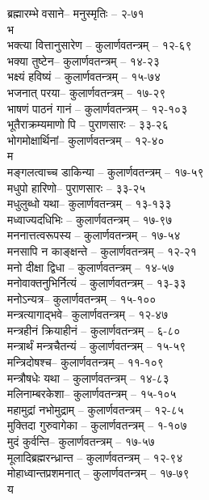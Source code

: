 \begin{raggedright}
\begin{parcolumns}[colwidths={1=.55\textwidth,2=.55\textwidth}]{2}
{ब्रह्मारम्भेवसाने– 	मनुस्मृतिः  – २-७१\\
{\large भ}\\
भक्त्या वित्तानुसारेण	– 	कुलार्णवतन्त्रम्  – १२-६९\\
भक्या तुष्टेन– 	कुलार्णवतन्त्रम्  – १४-२३\\
भक्ष्यं हविष्यं	– 	कुलार्णवतन्त्रम्  – १५-७४\\
भजनात् परया– 	 कुलार्णवतन्त्रम्  – १७-२९\\
भाषणं पाठनं गानं	– 	कुलार्णवतन्त्रम्  – १२-१०३\\
भूतैराक्रम्यमाणोपि	– 	पुराणसारः   – ३३-२६	\\
भोगमोक्षार्थिनां– कुलार्णवतन्त्रम्  – १२-४०\\
{\large म}\\
मङ्गलत्वाच्च डाकिन्या	– 	कुलार्णवतन्त्रम्  – १७-५९	\\
मधुपो हारिणो– 	पुराणसारः   – ३३-२५\\
मधुलुब्धो यथा– 	कुलार्णवतन्त्रम्  – १३-१३३\\
मध्वाज्यदधिभिः	– 	कुलार्णवतन्त्रम्  – १७-९७	\\
मननात्तत्वरूपस्य	– 	कुलार्णवतन्त्रम्  – १७-५४\\
मनसापि न काङ्क्षन्ते	– 	कुलार्णवतन्त्रम्  – १२-२१\\
मनो दीक्षा द्विधा	– 	कुलार्णवतन्त्रम्  – १४-५७\\
मनोवाक्तनुभिर्नित्यं	– 	कुलार्णवतन्त्रम्  – १३-३३\\
मनोऽन्यत्र– 	कुलार्णवतन्त्रम्  – १५-१००\\
मन्त्रत्यागाद्भवे– 	कुलार्णवतन्त्रम्  – १२-४७\\
मन्त्रहीनं क्रियाहीनं	– 	कुलार्णवतन्त्रम्  – ६-८०\\
मन्त्रार्थं मन्त्रचैतन्यं	– 	कुलार्णवतन्त्रम्  – १५-५९\\
मन्त्रिदोषश्च– 	कुलार्णवतन्त्रम्  – ११-१०९\\
मन्त्रौषधेः यथा	– 	कुलार्णवतन्त्रम्  – १४-८३\\
मलिनाम्बरकेशा– 	कुलार्णवतन्त्रम्  – १५-१०५\\
महामुद्रां नभोमुद्राम्	– 	कुलार्णवतन्त्रम्  – १२-८५\\
मुक्तिदा गुरुवागेका	– 	कुलार्णवतन्त्रम्  – १-१०७\\
मुदं कुर्वन्ति– 	 कुलार्णवतन्त्रम्  – १७-५७\\
मूलादिब्रह्मरन्ध्रान्त	– 	कुलार्णवतन्त्रम्  – १२-९४\\
मोहाध्वान्तप्रशमनात्	– 	कुलार्णवतन्त्रम्  – १७-७९	\\
{\large य}\\
}
\end{parcolumns}
\end{raggedright}

